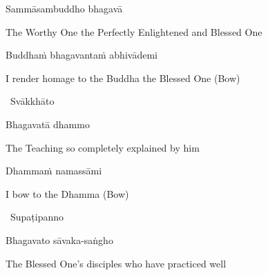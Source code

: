 \ifninebythirteen
\vspace{-0.25cm}
\else
\vspace{-0.5cm}
\fi

Sammāsambuddho bhagavā

\begin{english}
  The Worthy One the Perfectly Enlightened and Blessed One
\end{english}

Buddhaṁ bhagavantaṁ abhivādemi\relax

\begin{english}
  I render homage to the Buddha the Blessed One \hfill{\textnormal{\ifafive\fontsize{12.5}{18}\fi\ifninebythirteen\fontsize{9}{13}\fi\selectfont (Bow)}}
\end{english}

\begin{leader}
  \anglebracketleft\ \hspace{-0.5mm}Svākkhāto \hspace{-0.5mm}\anglebracketright\
\end{leader}

\ifninebythirteen
\vspace{-0.25cm}
\else
\vspace{-0.5cm}
\fi

Bhagavatā dhammo

\begin{english}
  The Teaching so completely explained by him
\end{english}

Dhammaṁ namassāmi\relax

\begin{english}
  I bow to the Dhamma \hfill{\textnormal{\ifafive\fontsize{12.5}{18}\fi\ifninebythirteen\fontsize{9}{13}\fi\selectfont (Bow)}}
\end{english}

\begin{leader}
  \anglebracketleft\ \hspace{-0.5mm}Supaṭipanno \hspace{-0.5mm}\anglebracketright\
\end{leader}

\ifninebythirteen
\vspace{-0.25cm}
\else
\vspace{-0.5cm}
\fi

Bhagavato sāvaka-saṅgho

\begin{english}
  The Blessed One's disciples who have practiced well
\end{english}

